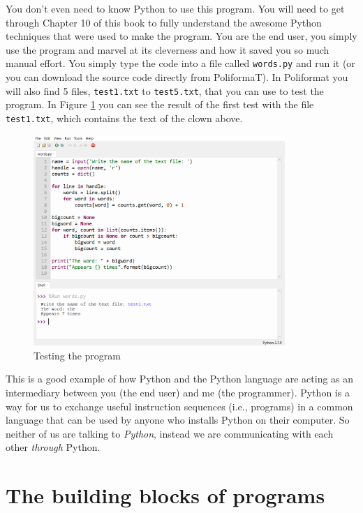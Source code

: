 You don't even need to know Python to use this program. You will need to get through Chapter 10 of this book to fully understand the awesome Python techniques that were used to make the program. You are the end user, you simply use the program and marvel at its cleverness and how it saved you so much manual effort. You simply type the code into a file called \verb|words.py| and run it (or you can download the source code directly from PoliformaT). In Poliformat you will also find 5 files, \verb|test1.txt| to \verb|test5.txt|, that you can use to test the program. In Figure \ref{fig:Thonny-execute-words} you can see the result of the first test with the file \verb|test1.txt|, which contains the text of the clown above.

\begin{figure}[t]
    \centering
    \includegraphics[width=0.85\textwidth]{images/Thonny-execute-words-eng.png}
    \caption{Testing the program}
    \label{fig:Thonny-execute-words}
\end{figure}



This is a good example of how Python and the Python language are acting as an intermediary between you (the end user) and me (the programmer). Python is a way for us to exchange useful instruction sequences (i.e., programs) in a common language that can be used by anyone who installs Python on their computer. So neither of us are talking to \emph{Python}, instead we are communicating with each other \emph{through} Python.






\hypertarget{los-bloques-de-construction-de-los-programas}{%
\section{The building blocks of programs}\label{los-bloques-de-construction-de-los-programas}}

